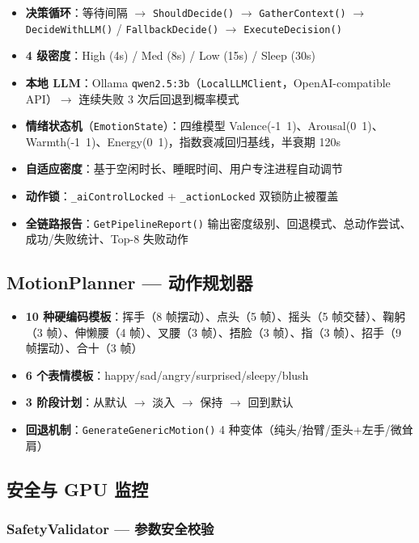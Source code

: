 \documentclass[12pt,a4paper]{ctexart}
\begin{document}
\begin{itemize}
    \item \textbf{决策循环}：等待间隔 $\rightarrow$ \texttt{ShouldDecide()} $\rightarrow$ \texttt{GatherContext()} $\rightarrow$ \texttt{DecideWithLLM()} / \texttt{FallbackDecide()} $\rightarrow$ \texttt{ExecuteDecision()}
    \item \textbf{4 级密度}：High (4s) / Med (8s) / Low (15s) / Sleep (30s)
    \item \textbf{本地 LLM}：Ollama \texttt{qwen2.5:3b}（\texttt{LocalLLMClient}，OpenAI-compatible API）$\rightarrow$ 连续失败 3 次后回退到概率模式
    \item \textbf{情绪状态机}（\texttt{EmotionState}）：四维模型 Valence(-1~1)、Arousal(0~1)、Warmth(-1~1)、Energy(0~1)，指数衰减回归基线，半衰期 120s
    \item \textbf{自适应密度}：基于空闲时长、睡眠时间、用户专注进程自动调节
    \item \textbf{动作锁}：\texttt{\_aiControlLocked} + \texttt{\_actionLocked} 双锁防止被覆盖
    \item \textbf{全链路报告}：\texttt{GetPipelineReport()} 输出密度级别、回退模式、总动作尝试、成功/失败统计、Top-8 失败动作
\end{itemize}

\subsection{MotionPlanner --- 动作规划器}

\begin{itemize}
    \item \textbf{10 种硬编码模板}：挥手（8 帧摆动）、点头（5 帧）、摇头（5 帧交替）、鞠躬（3 帧）、伸懒腰（4 帧）、叉腰（3 帧）、捂脸（3 帧）、指（3 帧）、招手（9 帧摆动）、合十（3 帧）
    \item \textbf{6 个表情模板}：happy/sad/angry/surprised/sleepy/blush
    \item \textbf{3 阶段计划}：从默认 $\rightarrow$ 淡入 $\rightarrow$ 保持 $\rightarrow$ 回到默认
    \item \textbf{回退机制}：\texttt{GenerateGenericMotion()} 4 种变体（纯头/抬臂/歪头+左手/微耸肩）
\end{itemize}

\subsection{安全与 GPU 监控}

\subsubsection{SafetyValidator --- 参数安全校验}
\end{document}
